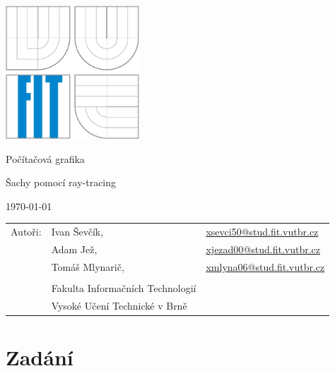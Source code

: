 \documentclass[12pt,a4paper,titlepage,final]{report}
\makeatletter
\newcommand\Course{Počítačová grafika}
\newcommand\WorkTitle{Šachy pomocí ray-tracing}
\newcommand\AuthorA{Ivan Ševčík}
\newcommand\AuthorAEmail{xsevci50@stud.fit.vutbr.cz}
\newcommand\AuthorB{Adam Jež}
\newcommand\AuthorBEmail{xjezad00@stud.fit.vutbr.cz}
\newcommand\AuthorC{Tomáš Mlynarič}
\newcommand\AuthorCEmail{xmlyna06@stud.fit.vutbr.cz}
\newcommand\Faculty{Fakulta Informačních Technologií}
\newcommand\School{Vysoké Učení Technické v Brně}
\makeatother
\begin{document}
	\begin{titlepage}
	\begin{center}
		\includegraphics[height=5cm]{images/logo.eps}
	\end{center}
	\vfill
	\begin{center}
		\begin{Large}
			\Course\\
		\end{Large}
		\bigskip
		\begin{Huge}
			\WorkTitle\\
		\end{Huge}
	\end{center}
	\vfill
	\begin{center}
		\begin{large}
			\today
		\end{large}
	\end{center}
	\vfill
	\begin{flushleft}
		\begin{large}
			\begin{tabular}{lll}
				Autoři: & \AuthorA, & \url{\AuthorAEmail} \\
				        & \AuthorB, & \url{\AuthorBEmail} \\
				        & \AuthorC, & \url{\AuthorCEmail} \\
				& & \\
				& \Faculty \\
				& \School \\
			\end{tabular}
		\end{large}
	\end{flushleft}
\end{titlepage}		
	
	
\tableofcontents

\newpage
\chapter{Zadání}
\end{document}
